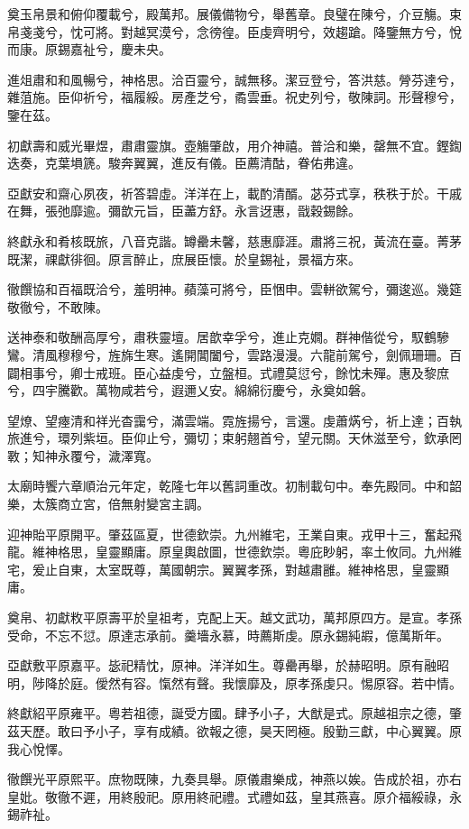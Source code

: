 \begin{pinyinscope}
奠玉帛景和俯仰覆載兮，殿萬邦。展儀備物兮，舉舊章。良璧在陳兮，介豆觴。束帛戔戔兮，忱可將。對越冥漠兮，念徬徨。臣虔齊明兮，效趨蹌。降鑒無方兮，悅而康。原錫嘉祉兮，慶未央。

進俎肅和和風暢兮，神格思。洽百靈兮，誠無移。潔豆登兮，答洪慈。膋芬達兮，雜菹施。臣仰祈兮，福履綏。房產芝兮，矞雲垂。祝史列兮，敬陳詞。形聲穆兮，鑒在茲。

初獻壽和威光畢煜，肅肅靈旗。壺觴肇啟，用介神禧。普洽和樂，罄無不宜。鏗鍧迭奏，克葉塤篪。駿奔翼翼，進反有儀。臣薦清酤，眷佑弗違。

亞獻安和齋心夙夜，祈答碧虛。洋洋在上，載酌清醑。苾芬式享，秩秩于於。干戚在舞，張弛靡逾。彌歆元旨，臣藎方舒。永言迓惠，戩穀錫餘。

終獻永和肴核既旅，八音克諧。罇罍未馨，慈惠靡涯。肅將三祝，黃流在臺。菁茅既潔，祼獻徘徊。原言醉止，庶展臣懷。於皇錫祉，景福方來。

徹饌協和百福既洽兮，羞明神。蘋藻可將兮，臣悃申。雲軿欲駕兮，彌逡巡。幾筵敬徹兮，不敢陳。

送神泰和敬酬高厚兮，肅秩靈壇。居歆幸孚兮，進止克嫺。群神偕從兮，馭鶴驂鸞。清風穆穆兮，旌旆生寒。遙開閶闔兮，雲路漫漫。六龍前駕兮，劍佩珊珊。百闢相事兮，卿士戒班。臣心益虔兮，立盤桓。式禮莫愆兮，餘忱未殫。惠及黎庶兮，四宇騰歡。萬物咸若兮，遐邇乂安。綿綿衍慶兮，永奠如磐。

望燎、望瘞清和祥光杳靄兮，滿雲端。霓旌揚兮，言還。虔蕭焫兮，祈上達；百執旅進兮，環列紫垣。臣仰止兮，彌切；束躬翹首兮，望元關。天休滋至兮，欽承罔斁；知神永覆兮，濊澤寬。

太廟時饗六章順治元年定，乾隆七年以舊詞重改。初制載句中。奉先殿同。中和韶樂，太簇商立宮，倍無射變宮主調。

迎神貽平原開平。肇茲區夏，世德欽崇。九州維宅，王業自東。戎甲十三，奮起飛龍。維神格思，皇靈顯庸。原皇輿啟圖，世德欽崇。粵庇眇躬，率土攸同。九州維宅，爰止自東，太室既尊，萬國朝宗。翼翼孝孫，對越肅雝。維神格思，皇靈顯庸。

奠帛、初獻敉平原壽平於皇祖考，克配上天。越文武功，萬邦原四方。是宣。孝孫受命，不忘不愆。原達志承前。羹墻永慕，時薦斯虔。原永錫純嘏，億萬斯年。

亞獻敷平原嘉平。毖祀精忱，原神。洋洋如生。尊罍再舉，於赫昭明。原有融昭明，陟降於庭。僾然有容。愾然有聲。我懷靡及，原孝孫虔只。惕原容。若中情。

終獻紹平原雍平。粵若祖德，誕受方國。肆予小子，大猷是式。原越祖宗之德，肇茲天歷。敢曰予小子，享有成績。欲報之德，昊天罔極。殷勤三獻，中心翼翼。原我心悅懌。

徹饌光平原熙平。庶物既陳，九奏具舉。原儀肅樂成，神燕以娭。告成於祖，亦右皇妣。敬徹不遲，用終殷祀。原用終祀禮。式禮如茲，皇其燕喜。原介福綏祿，永錫祚祉。


\end{pinyinscope}
